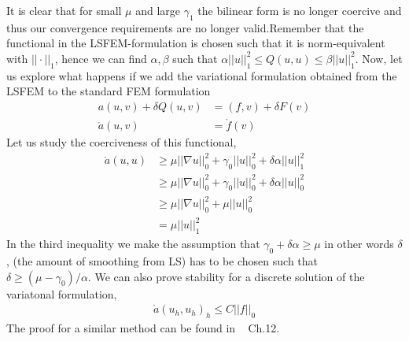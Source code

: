 It is clear that for small $\mu$ and large $\gamma_1$ the bilinear form is no longer coercive and thus our convergence requirements are no longer valid.Remember that the functional in the LSFEM-formulation is chosen such that it is norm-equivalent with $|| \cdot ||_1 $, hence we can find $\alpha,\beta$ such that $\alpha||u||_1^2 \leq Q(u,u) \leq \beta||u||_1^2 $.
Now, let us explore what happens if we add the variational formulation obtained from the LSFEM to the standard FEM formulation
\begin{align}
	a(u,v) + \delta Q(u,v) &= (f,v) + \delta F(v) \\
	\mathring{a}(u,v) &= \mathring{f}(v)
	\label{eq:GLS}
\end{align}
Let us study the coerciveness of this functional,
\begin{align}
	\mathring{a}(u,u) &\geq \mu ||\nabla u||_0^2+\gamma_0||u||_0^2+\delta \alpha ||u||^2_1 \\
	&\geq \mu ||\nabla u||_0^2+\gamma_0||u||_0^2+\delta \alpha ||u||^2_0 \\
	&\geq \mu ||\nabla u||_0^2+\mu ||u||_0^2 \\
	&= \mu ||u||^2_1
	\label{eq:coercivity}
\end{align}
In the third inequality we make the assumption that $\gamma_0+\delta \alpha \geq \mu $ in other words $\delta$, (the amount of smoothing from LS) has to be chosen such that $\delta \geq (\mu-\gamma_0)/\alpha$.
We can also prove stability for a discrete solution of the variatonal formulation, 
\begin{align}
	\mathring{a}(u_h,u_h)_h \leq C ||f||_0
	\label{eq:stabilityResult}
\end{align}
The proof for a similar method can be found in ~\cite{Quarteroni} Ch.12. 



